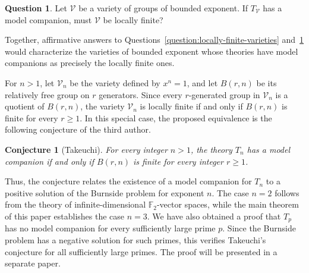 \documentclass[11pt,reqno]{article}
\newtheorem*{conjecture*}{Conjecture}
\theoremstyle{definition}
\newtheorem{question}[theorem]{Question}
\theoremstyle{remark}
\begin{document}
\begin{question}\label{question:bounded-exponent-varieties}
Let $\mathcal V$ be a variety of groups of bounded exponent.
If $T_{\mathcal V}$ has a model companion, must $\mathcal V$ be
locally finite?
\end{question}

Together, affirmative answers to
Questions~\ref{question:locally-finite-varieties}
and~\ref{question:bounded-exponent-varieties} would characterize
the varieties of bounded exponent whose theories have model
companions as precisely the locally finite ones.

For $n>1$, let $\mathcal V_n$ be the variety defined by $x^n=1$,
and let $B(r,n)$ be its relatively free group on $r$ generators.
Since every $r$-generated group in $\mathcal V_n$ is a quotient
of $B(r,n)$, the variety $\mathcal V_n$ is locally finite if and
only if $B(r,n)$ is finite for every $r\geq1$.
In this special case, the proposed equivalence is the following
conjecture of the third author.

\begin{conjecture*}[Takeuchi]
For every integer $n>1$, the theory $T_n$ has a model companion
if and only if $B(r,n)$ is finite for every integer $r\geq1$.
\end{conjecture*}

Thus, the conjecture relates the existence of a model companion
for $T_n$ to a positive solution of the Burnside problem for
exponent $n$. The case $n=2$ follows from the theory of
infinite-dimensional $\mathbb F_2$-vector spaces, while the main
theorem of this paper establishes the case $n=3$.
We have also obtained a proof that $T_p$ has no model companion for
every sufficiently large prime $p$. Since the Burnside problem has a
negative solution for such primes, this verifies Takeuchi's conjecture
for all sufficiently large primes. The proof will be presented in a
separate paper.
\fi




% 
% 
\end{document}
